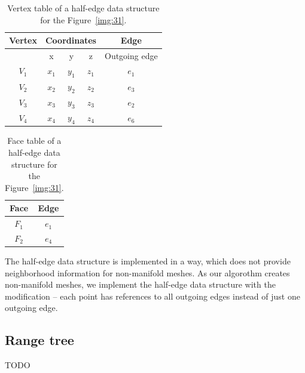 \begin{table}[]
    \centering
    \begin{tabular}{|c|ccc|c|}
    \hline
    \hline
    Vertex  & \multicolumn{3}{c|}{Coordinates}          & Edge            \\ \hline
          & x            & y            & z           & Outgoing edge   \\ \hline\hline
    $V_1$ & $x_1$        & $y_1$        & $z_1$       & $e_1$           \\ \hline
    $V_2$ & $x_2$        & $y_2$        & $z_2$       & $e_3$           \\ \hline
    $V_3$ & $x_3$        & $y_3$        & $z_3$       & $e_2$           \\ \hline
    $V_4$ & $x_4$        & $y_4$        & $z_4$       & $e_6$           \\ \hline\hline
    \end{tabular}
\caption{Vertex table of a half-edge data structure for the Figure~\ref{img:31}.}
\label{tab:6}
\end{table}

\begin{table}[]
    \centering
    \begin{tabular}{|c|c|}
    \hline
    \hline
    Face  & Edge            \\ \hline\hline
    $F_1$ & $e_1$           \\ \hline
    $F_2$ & $e_4$           \\ \hline\hline
    \end{tabular}
\caption{Face table of a half-edge data structure for the Figure~\ref{img:31}.}
\label{tab:7}
\end{table}

The half-edge data structure is implemented in a way, which does not provide 
neighborhood information for non-manifold meshes.
As our algorothm creates non-manifold meshes, we implement the half-edge data
structure with the modification -- each point has references to all outgoing edges
instead of just one outgoing edge. 

\subsection{Range tree}
TODO
